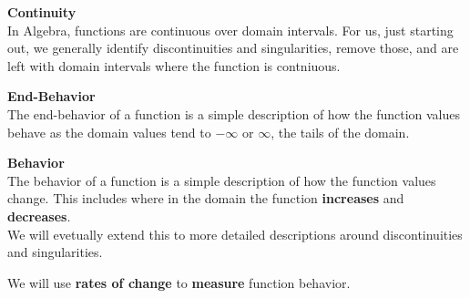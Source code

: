 \documentclass{ximera}
\begin{document}
\begin{explanation}  \textbf{\textcolor{blue!75!black}{Continuity}} \\

In Algebra, functions are continuous over domain intervals.  For us, just starting out, we generally identify discontinuities and singularities, remove those, and are left with domain intervals where the function is contniuous.

\end{explanation}







\begin{explanation}  \textbf{\textcolor{blue!75!black}{End-Behavior}} \\

The end-behavior of a function is a simple description of how the function values behave as the domain values tend to $-\infty$ or $\infty$, the tails of the domain.

\end{explanation}









\begin{explanation}  \textbf{\textcolor{blue!75!black}{Behavior}} \\

The behavior of a function is a simple description of how the function values change.  This includes where in the domain the function \textbf{\textcolor{purple!85!blue}{increases}} and \textbf{\textcolor{purple!85!blue}{decreases}}. \\


We will evetually extend this to more detailed descriptions around discontinuities and singularities.


We will use \textbf{rates of change} to \textbf{measure} function behavior.

\end{explanation}
\end{document}
